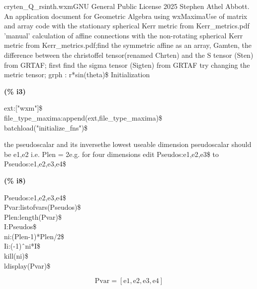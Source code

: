 \documentclass[fleqn]{article}
\begin{document}
cryten\_Q\_rsinth.wxmGNU General Public License 2025  Stephen Athel Abbott.
An application document for Geometric Algebra using wxMaximaUse of matrix and array code with the stationary spherical Kerr metric from Kerr\_metrics.pdf
'manual' calculation of affine connections with the non-rotating spherical Kerr metric from Kerr\_metrics.pdf;find the symmetric affine as an array, Gamten, the difference between the christoffel tensor(renamed Chrten) and the S tensor (Sten) from GRTAF; first find the sigma tensor (Sigten) from GRTAF
try changing the metric tensor; grph : r*sin(theta)\$
Initialization


\noindent
\begin{minipage}[t]{4.000000em}\color{red}\bfseries
(\% i3)	
\end{minipage}
\begin{minipage}[t]{\textwidth}\color{blue}
ext:["wxm"]\$\\
file\_type\_maxima:append(ext,file\_type\_maxima)\$\\
batchload("initialize\_fns")\$
\end{minipage}

\noindent%

the pseudoscalar and its inversethe lowest useable dimension pseudoscalar should be {e1,e2} i.e. Plen = 2e.g. for four dimensions edit Pseudos:{e1,e2,e3}\$ to Pseudos:{e1,e2,e3,e4}\$


\noindent
\begin{minipage}[t]{4.000000em}\color{red}\bfseries
(\% i8)	
\end{minipage}
\begin{minipage}[t]{\textwidth}\color{blue}
Pseudos:{e1,e2,e3,e4}\$\\
Pvar:listofvars(Pseudos)\$\\
Plen:length(Pvar)\$\\
I:Pseudos\$\\
ni:(Plen-1)*Plen/2\$\\
Ii:(-1)\^\ ni*I\$\\
kill(ni)\$\\
ldisplay(Pvar)\$
\end{minipage}
\[\displaystyle \tag{\% t8} 
\ensuremath{\mathrm{Pvar}}\mathop{=}\left[ \ensuremath{\mathrm{e1}}\mathop{,}\ensuremath{\mathrm{e2}}\mathop{,}\ensuremath{\mathrm{e3}}\mathop{,}\ensuremath{\mathrm{e4}}\right] \mbox{}
\]
\end{document}
